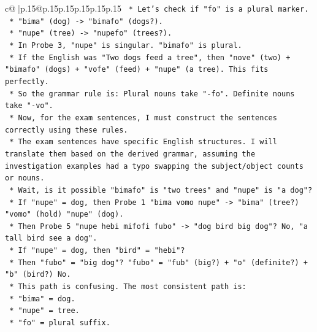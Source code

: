 \documentclass{article}
\begin{document}
{\begin{supertabular}{c@{$\;$}|p{.15\linewidth}@{}p{.15\linewidth}p{.15\linewidth}p{.15\linewidth}p{.15\linewidth}p{.15\linewidth}}
{{{\texttt{                                *   Let's check if "fo" is a plural marker.} \\
\texttt{                                *   "bima" (dog) {-}> "bimafo" (dogs?).} \\
\texttt{                                *   "nupe" (tree) {-}> "nupefo" (trees?).} \\
\texttt{                                *   In Probe 3, "nupe" is singular. "bimafo" is plural.} \\
\texttt{                                *   If the English was "Two dogs feed a tree", then "nove" (two) + "bimafo" (dogs) + "vofe" (feed) + "nupe" (a tree). This fits perfectly.} \\
\texttt{                                *   So the grammar rule is: Plural nouns take "{-}fo". Definite nouns take "{-}vo".} \\
\texttt{                                *   Now, for the exam sentences, I must construct the sentences correctly using these rules.} \\
\texttt{                                *   The exam sentences have specific English structures. I will translate them based on the derived grammar, assuming the investigation examples had a typo swapping the subject/object counts or nouns.} \\
\texttt{                                *   Wait, is it possible "bimafo" is "two trees" and "nupe" is "a dog"?} \\
\texttt{                                    *   If "nupe" = dog, then Probe 1 "bima vomo nupe" {-}> "bima" (tree?) "vomo" (hold) "nupe" (dog).} \\
\texttt{                                    *   Then Probe 5 "nupe hebi mifofi fubo" {-}> "dog bird big dog"? No, "a tall bird see a dog".} \\
\texttt{                                    *   If "nupe" = dog, then "bird" = "hebi"?} \\
\texttt{                                    *   Then "fubo" = "big dog"? "fubo" = "fub" (big?) + "o" (definite?) + "b" (bird?) No.} \\
\texttt{                                    *   This path is confusing. The most consistent path is:} \\
\texttt{                                        *   "bima" = dog.} \\
\texttt{                                        *   "nupe" = tree.} \\
\texttt{                                        *   "fo" = plural suffix.} \\
}}}
\end{supertabular}}
\end{document}
